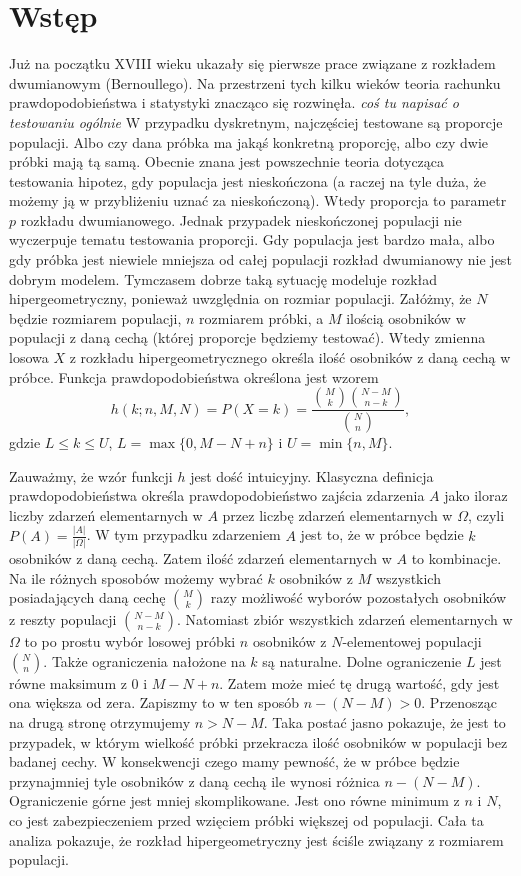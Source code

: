 \chapter*{Wstęp}
Już na początku XVIII wieku ukazały się pierwsze prace związane z rozkładem dwumianowym (Bernoullego). Na przestrzeni tych kilku wieków teoria rachunku prawdopodobieństwa i statystyki znacząco się rozwinęła. \textit{coś tu napisać o testowaniu ogólnie} W przypadku dyskretnym, najczęściej testowane są proporcje populacji. Albo czy dana próbka ma jakąś konkretną proporcję, albo czy dwie próbki mają tą samą. Obecnie znana jest powszechnie teoria dotycząca testowania hipotez, gdy populacja jest nieskończona (a raczej na tyle duża, że możemy ją w przybliżeniu uznać za nieskończoną). Wtedy proporcja to parametr $p$ rozkładu dwumianowego. Jednak przypadek nieskończonej populacji nie wyczerpuje tematu testowania proporcji. Gdy populacja jest bardzo mała, albo gdy próbka jest niewiele mniejsza od całej populacji rozkład dwumianowy nie jest dobrym modelem. Tymczasem dobrze taką sytuację modeluje rozkład hipergeometryczny, ponieważ uwzględnia on rozmiar populacji. Załóżmy, że $N$ będzie rozmiarem populacji, $n$ rozmiarem próbki, a $M$ ilością osobników w populacji z daną cechą (której proporcje będziemy testować). Wtedy zmienna losowa $X$ z rozkładu hipergeometrycznego określa ilość osobników z daną cechą w próbce. Funkcja prawdopodobieństwa określona jest wzorem
\begin{equation}
h(k;n,M,N) = P(X=k) = \frac{\binom{M}{k} \binom{N-M}{n-k}}{\binom{N}{n}},
\end{equation}
gdzie $L\leq k\leq U$, $L=\max\{0,M-N+n\}$ i $U=\min\{n,M\}$.

Zauważmy, że wzór funkcji $h$ jest dość intuicyjny. Klasyczna definicja prawdopodobieństwa określa prawdopodobieństwo zajścia zdarzenia $A$ jako iloraz liczby zdarzeń elementarnych w $A$ przez liczbę zdarzeń elementarnych w $\Omega$, czyli $P(A) = \frac{|A|}{|\Omega|}$. W tym przypadku zdarzeniem $A$ jest to, że w próbce będzie $k$ osobników z daną cechą. Zatem ilość zdarzeń elementarnych w $A$ to kombinacje. Na ile różnych sposobów możemy wybrać $k$ osobników z $M$ wszystkich posiadających daną cechę $\binom{M}{k}$ razy możliwość wyborów pozostałych osobników z reszty populacji $\binom{N-M}{n-k}$. Natomiast zbiór wszystkich zdarzeń elementarnych w $\Omega$ to po prostu wybór losowej próbki $n$ osobników z $N$-elementowej populacji $\binom{N}{n}$. Także ograniczenia nałożone na $k$ są naturalne. Dolne ograniczenie $L$ jest równe maksimum z $0$ i $M-N+n$. Zatem może mieć tę drugą wartość, gdy jest ona większa od zera. Zapiszmy to w ten sposób $n-(N-M)>0$. Przenosząc na drugą stronę otrzymujemy $n>N-M$. Taka postać jasno pokazuje, że jest to przypadek, w którym wielkość próbki przekracza ilość osobników w populacji bez badanej cechy. W konsekwencji czego mamy pewność, że w próbce będzie przynajmniej tyle osobników z daną cechą ile wynosi różnica $n-(N-M)$. Ograniczenie górne jest mniej skomplikowane. Jest ono równe minimum z $n$ i $N$, co jest zabezpieczeniem przed wzięciem próbki większej od populacji. Cała ta analiza pokazuje, że rozkład hipergeometryczny jest ściśle związany z rozmiarem populacji.

